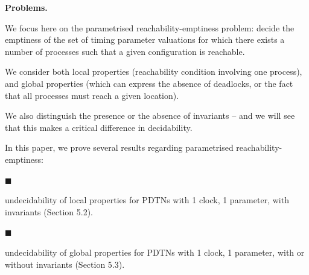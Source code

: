 \documentclass[10pt,a4paper]{article}
\begin{document}
 
 
 
\par\medskip\noindent\textbf{Problems.}\par
 
 
We focus here on the parametrised reachability-emptiness problem: decide the emptiness of the set of timing parameter valuations for which there exists a number of processes such that a given configuration is reachable.\par
 
 
 
We consider both local properties (reachability condition involving one process), and global properties (which can express the absence of deadlocks, or the fact that all processes must reach a given location).\par
 
 
 
We also distinguish the presence or the absence of invariants -- and we will see that this makes a critical difference in decidability.\par
 
 
 
In this paper, we prove several results regarding parametrised reachability-emptiness:\par
  
\par\noindent  $\blacksquare$ 
 
undecidability of local properties for PDTNs with 1 clock, 1 parameter, with invariants (Section 5.2).\par
 
 
 
\par\noindent  $\blacksquare$ 
 
undecidability of global properties for PDTNs with 1 clock, 1 parameter, with or without invariants (Section 5.3).\par
 
 
\end{document}
